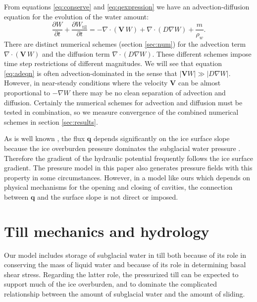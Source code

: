 \documentclass[gmd]{copernicus}   %
\newcommand{\text}{\textrm}
\newcommand\bV{\mathbf{V}}
\newcommand\bq{\mathbf{q}}
\newcommand{\Div}{\nabla\cdot}
\newcommand{\grad}{\nabla}
\newcommand{\Wtil}{W_{\text{til}}}
\begin{document}
From equations \eqref{eq:conserve} and \eqref{eq:qexpression} we have an advection-diffusion equation \citep{HundsdorferVerwer2010} for the evolution of the water amount:
\begin{equation} \label{eq:adeqn}
  \frac{\partial W}{\partial t} + \frac{\partial \Wtil}{\partial t} = - \Div\left(\bV\, W\right) + \Div \left(D \grad W\right) + \frac{m}{\rho_w}.
\end{equation}
There are distinct numerical schemes (section \ref{sec:num}) for the advection term $\Div\left(\bV\, W\right)$ and the diffusion term $\Div \left(D \grad W\right)$.  These different schemes impose time step restrictions of different magnitudes.  We will see that equation \eqref{eq:adeqn} is often advection-dominated in the sense that $|\bV W| \gg |D \grad W|$.  However, in near-steady conditions where the velocity $\bV$ can be almost proportional to $-\grad W$ there may be no clean separation of advection and diffusion.  Certainly the numerical schemes for advection and diffusion must be tested in combination, so we measure convergence of the combined numerical schemes in section \ref{sec:results}.

As is well known \citep{Clarke05}, the flux $\bq$ depends significantly on the ice surface slope because the ice overburden pressure dominates the subglacial water pressure \citep{Shreve1972}.  Therefore the gradient of the hydraulic potential frequently follows the ice surface gradient.  The pressure model in this paper also generates pressure fields with this property in some circumstances.  However, in a model like ours which depends on physical mechanisms for the opening and closing of cavities, the connection between $\bq$ and the surface slope is not direct or imposed.


\section{Till mechanics and hydrology} \label{sec:tillmechanics}

Our model includes storage of subglacial water in till both because of its role in conserving the mass of liquid water and because of its role in determining basal shear stress.  Regarding the latter role, the pressurized till can be expected to support much of the ice overburden, and to dominate the complicated relationship between the amount of subglacial water and the amount of sliding.
\end{document}
